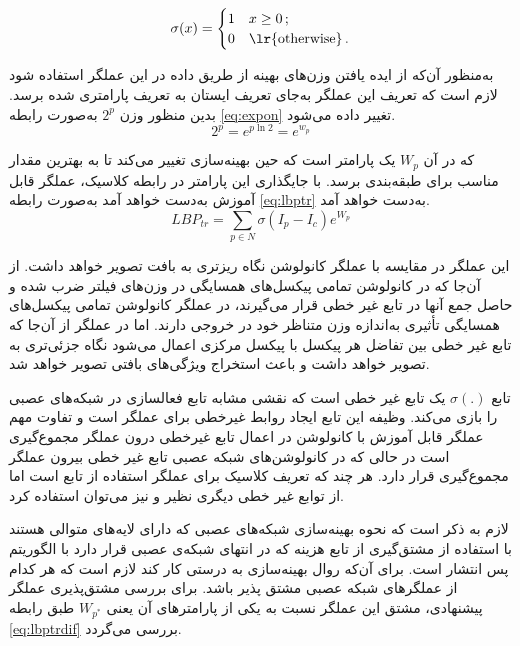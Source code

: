 	\[ \sigma(x) = 
	\begin{cases} 1  & \text{$x \geq 0 $}\,; \\
		0  & \text{\lr{otherwise}}\,.
	\end{cases} \]


به‌منظور آن‌که از ایده یافتن وزن‌های بهینه از طریق داده در این عملگر استفاده شود لازم است که تعریف این عملگر به‌جای تعریف ایستان به تعریف پارامتری شده برسد. بدین منظور وزن
$2^p$
 به‌صورت رابطه
\ref{eq:expon}
 تغییر داده می‌شود.
\begin{equation}\label{eq:expon}
	2^p=e^{p\ln{2}}=e^{w_p}
\end{equation}

که در آن 
$W_p$
 یک پارامتر است که حین بهینه‌سازی تغییر می‌کند تا به بهترین مقدار مناسب برای طبقه‌بندی برسد. با جایگذاری این پارامتر در رابطه  کلاسیک، عملگر  قابل آموزش به‌دست خواهد آمد به‌صورت رابطه
\ref{eq:lbptr}
به‌دست خواهد آمد.
\begin{equation}\label{eq:lbptr}
		LBP_{tr}=\sum_{p\in N}\sigma(I_p-I_c)e^{W_p} 
\end{equation}

این عملگر در مقایسه با عملگر کانولوشن نگاه ریزتری به بافت تصویر خواهد داشت. از آن‌جا که در کانولوشن تمامی پیکسل‌های همسایگی در وزن‌های فیلتر ضرب شده و حاصل جمع آنها در تابع غیر خطی قرار می‌گیرند، در عملگر کانولوشن تمامی پیکسل‌های همسایگی تأثیری به‌اندازه وزن متناظر خود در خروجی دارند. اما در عملگر  از آن‌جا که تابع غیر خطی بین تفاضل هر پیکسل با پیکسل مرکزی اعمال می‌شود نگاه جزئی‌تری به تصویر خواهد داشت و باعث استخراج ویژگی‌های بافتی تصویر خواهد شد. 

تابع 
$\sigma(.)$
 یک تابع غیر خطی است که نقشی مشابه تابع فعالسازی
  در شبکه‌های عصبی را بازی می‌کند. وظیفه این تابع ایجاد روابط غیرخطی برای عملگر است و تفاوت مهم عملگر  قابل آموزش با کانولوشن در اعمال تابع غیرخطی درون عملگر مجموع‌گیری است در حالی که در کانولوشن‌های شبکه عصبی تابع غیر خطی بیرون عملگر  مجموع‌گیری قرار دارد. هر چند که تعریف کلاسیک برای عملگر  استفاده از تابع  است اما از توابع غیر خطی دیگری نظیر  و  نیز می‌توان استفاده کرد.
  
لازم به ذکر است که نحوه بهینه‌سازی شبکه‌های عصبی که دارای لایه‌های متوالی هستند با استفاده از مشتق‌گیری از تابع هزینه که در انتهای شبکه‌ی عصبی قرار دارد با الگوریتم پس انتشار
 است. برای آن‌که روال بهینه‌سازی به درستی کار کند لازم است که هر کدام از عملگرهای شبکه عصبی مشتق پذیر باشد. برای بررسی مشتق‌پذیری عملگر پیشنهادی، مشتق این عملگر نسبت به یکی از پارامتر‌های آن یعنی 
$W_{p^*}$
طبق رابطه
\ref{eq:lbptrdif}
بررسی می‌گردد.
 
